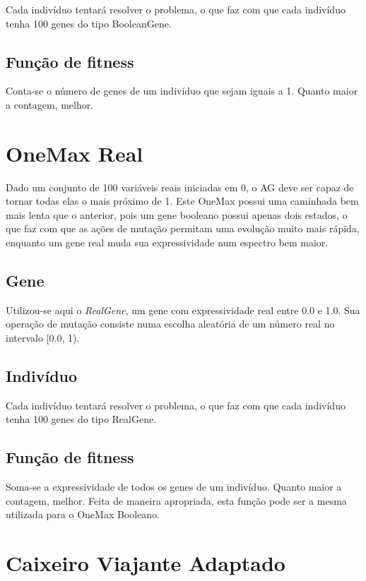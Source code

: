 Cada indivíduo tentará resolver o problema, o que faz com que cada indivíduo tenha 100 genes do tipo BooleanGene.

\subsection*{Função de fitness}

Conta-se o número de genes de um indivíduo que sejam iguais a 1. Quanto maior a contagem, melhor.

\section{OneMax Real}

Dado um conjunto de 100 variáveis reais iniciadas em 0, o AG deve ser capaz de tornar todas elas o mais próximo de 1. Este OneMax possui uma caminhada bem mais lenta que o anterior, pois um gene booleano possui apenas dois estados, o que faz com que as ações de mutação permitam uma evolução muito mais rápida, enquanto um gene real muda sua expressividade num espectro bem maior.

\subsection*{Gene}

Utilizou-se aqui o \emph{RealGene}, um gene com expressividade real entre 0.0 e 1.0. Sua operação de mutação consiste numa escolha aleatória de um número real no intervalo [0.0, 1).

\subsection*{Indivíduo}

Cada indivíduo tentará resolver o problema, o que faz com que cada indivíduo tenha 100 genes do tipo RealGene.

\subsection*{Função de fitness}

Soma-se a expressividade de todos os genes de um indivíduo. Quanto maior a contagem, melhor. Feita de maneira apropriada, esta função pode ser a mesma utilizada para o OneMax Booleano.

\section{Caixeiro Viajante Adaptado}


